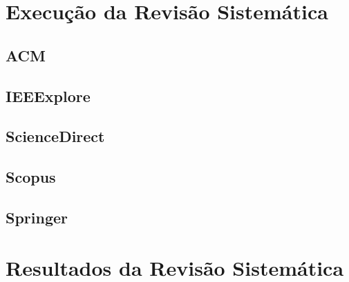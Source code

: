 \section{Execução da Revisão Sistemática}
\label{s_apendiceB_execução}




\subsection{ACM}
\label{ss_apendiceB_acm}




\subsection{IEEExplore}
\label{ss_apendiceB_ieee}





\subsection{ScienceDirect}
\label{ss_apendiceB_sciencedirect}





\subsection{Scopus}
\label{ss_apendiceB_scopus}





\subsection{Springer}
\label{ss_apendiceB_springer}




\section{Resultados da Revisão Sistemática}
\label{s_apendiceB_resultado}



